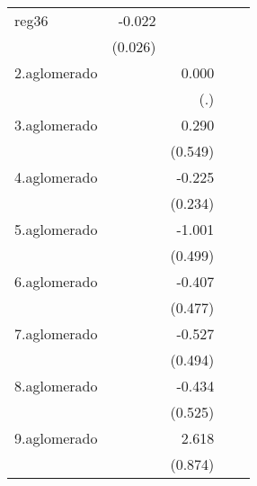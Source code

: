 {\begin{longtable}{l*{4}{D{.}{.}{-1}}}
\addlinespace
reg36       &      -0.022         &                     &                     &                     \\
            &     (0.026)         &                     &                     &                     \\
\addlinespace
2.aglomerado&                     &       0.000         &                     &                     \\
            &                     &         (.)         &                     &                     \\
\addlinespace
3.aglomerado&                     &       0.290         &                     &                     \\
            &                     &     (0.549)         &                     &                     \\
\addlinespace
4.aglomerado&                     &      -0.225         &                     &                     \\
            &                     &     (0.234)         &                     &                     \\
\addlinespace
5.aglomerado&                     &      -1.001\sym{*}  &                     &                     \\
            &                     &     (0.499)         &                     &                     \\
\addlinespace
6.aglomerado&                     &      -0.407         &                     &                     \\
            &                     &     (0.477)         &                     &                     \\
\addlinespace
7.aglomerado&                     &      -0.527         &                     &                     \\
            &                     &     (0.494)         &                     &                     \\
\addlinespace
8.aglomerado&                     &      -0.434         &                     &                     \\
            &                     &     (0.525)         &                     &                     \\
\addlinespace
9.aglomerado&                     &       2.618\sym{**} &                     &                     \\
            &                     &     (0.874)         &                     &                     \\

\end{longtable}}
